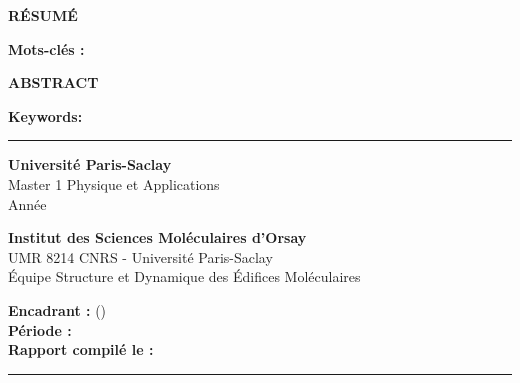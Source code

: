 
\newpage
\thispagestyle{empty}

\vspace*{2cm}

\begin{center}
    {\Large \textbf{RÉSUMÉ}}
\end{center}

\vspace{0.5cm}

\resumefr

\vspace{0.5cm}

\textbf{Mots-clés :} \keywordsfr

\vspace{2cm}

\begin{center}
    {\Large \textbf{ABSTRACT}}
\end{center}

\vspace{0.5cm}

\resumeen

\vspace{0.5cm}

\textbf{Keywords:} \keywordsen

\vfill

\hrule
\vspace{0.3cm}

\begin{minipage}[t]{0.48\textwidth}
    \textbf{Université Paris-Saclay}\\
    Master 1 Physique et Applications\\
    Année \academicyear
\end{minipage}
\hfill
\begin{minipage}[t]{0.48\textwidth}
    \textbf{Institut des Sciences Moléculaires d'Orsay}\\
    UMR 8214 CNRS - Université Paris-Saclay\\
    Équipe Structure et Dynamique des Édifices Moléculaires
\end{minipage}

\vspace{0.3cm}

\begin{center}
    \textbf{Encadrant :} \supervisor{} (\supervisoremail)\\
    \textbf{Période :} \internshipperiod{} \\
    \textbf{Rapport compilé le :} \compiledate
\end{center}

\vspace{0.3cm}
\hrule